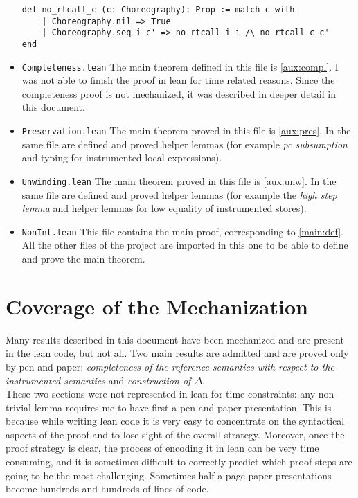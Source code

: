 \documentclass[12pt,a4paper,twoside]{book}
\begin{document}
\begin{itemize}
\begin{samepage}
\begin{verbatim}
def no_rtcall_c (c: Choreography): Prop := match c with
    | Choreography.nil => True
    | Choreography.seq i c' => no_rtcall_i i /\ no_rtcall_c c'
end
\end{verbatim}
\end{samepage}
\item \texttt{Completeness.lean} The main theorem defined in this file is \ref{aux:compl}. I was not able to finish the proof in lean for time related reasons. Since the completeness proof is not mechanized, it was described in deeper detail in this document.
\item \texttt{Preservation.lean} The main theorem proved in this file is \ref{aux:pres}. In the same file are defined and proved helper lemmas (for example \emph{pc subsumption} and typing for instrumented local expressions).
\item \texttt{Unwinding.lean} The main theorem proved in this file is \ref{aux:unw}. In the same file are defined and proved helper lemmas (for example the \emph{high step lemma}\cite{myers2011proving} and helper lemmas for low equality of instrumented stores).
\item \texttt{NonInt.lean} This file contains the main proof, corresponding to \ref{main:def}.
All the other files of the project are imported in this one to be able to define and prove the main theorem.
\end{itemize}

\section{Coverage of the Mechanization}
Many results described in this document have been mechanized and are present in the lean code, but not all.
Two main results are admitted and are proved only by pen and paper: \emph{completeness of the reference semantics with respect to the instrumented semantics} and \emph{construction of $\Delta$}.\\
These two sections were not represented in lean for time constraints: any non-trivial lemma requires me to have first a pen and paper presentation. This is because while writing lean code it is very easy to concentrate on the syntactical aspects of the proof and to lose sight of the overall strategy.
Moreover, once the proof strategy is clear, the process of encoding it in lean can be very time consuming, and it is sometimes difficult to correctly predict which proof steps are going to be the most challenging. Sometimes half a page paper presentations become hundreds and hundreds of lines of code.
\end{document}
